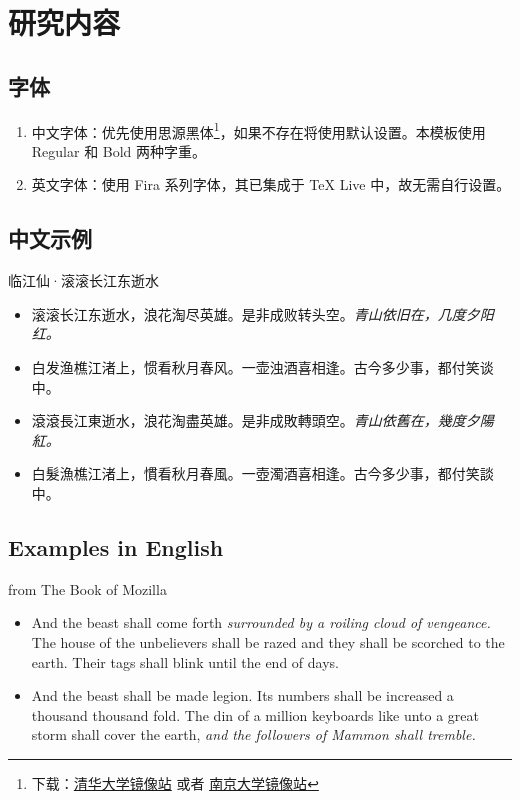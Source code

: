 \documentclass[no-math]{ctexbeamer}
\begin{document}
\section{研究内容}

\subsection{字体}
\begin{frame}
	\begin{enumerate}
		\item 中文字体：优先使用思源黑体\footnote{下载：\href{https://mirrors.tuna.tsinghua.edu.cn/adobe-fonts/source-han-sans/SubsetOTF/CN/}{清华大学镜像站} 或者 \href{https://mirror.nju.edu.cn/adobe-fonts/source-han-sans/SubsetOTF/CN/}{南京大学镜像站}}，如果不存在将使用默认设置。本模板使用 Regular 和 Bold 两种字重。
		\item 英文字体：使用 Fira 系列字体，其已集成于 TeX Live 中，故无需自行设置。
	\end{enumerate}
\end{frame}

\subsection{中文示例}

\begin{frame}{临江仙·滚滚长江东逝水}
	\begin{itemize}
		\item 滚滚长江东逝水，浪花淘尽英雄。是非成败转头空。\emph{青山依旧在，几度夕阳红。}
		\item 白发渔樵江渚上，惯看秋月春风。一壶浊酒喜相逢。古今多少事，都付笑谈中。
		\item 滾滾長江東逝水，浪花淘盡英雄。是非成敗轉頭空。\emph{青山依舊在，幾度夕陽紅。}
		\item 白髮漁樵江渚上，慣看秋月春風。一壺濁酒喜相逢。古今多少事，都付笑談中。
	\end{itemize}
\end{frame}

\subsection{Examples in English}

\begin{frame}{from The Book of Mozilla}
	\begin{itemize}
		\item And the beast shall come forth \emph{surrounded by a roiling cloud of vengeance.} The house of the unbelievers shall be razed and they shall be scorched to the earth. Their tags shall blink until the end of days.
		\item And the beast shall be made legion. Its numbers shall be increased a thousand thousand fold. The din of a million keyboards like unto a great storm shall cover the earth, \textit{and the followers of Mammon shall tremble.}
	\end{itemize}
\end{frame}
\end{document}
